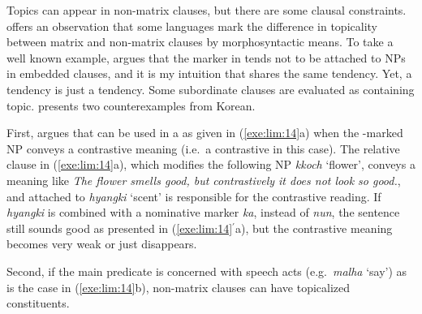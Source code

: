 Topics can appear in non-matrix clauses, but there are some clausal
constraints.  \citet[126]{lambrecht:96} offers an observation that
some languages mark the difference in topicality between matrix and
non-matrix clauses by morphosyntactic means.  To take a well known
example, \citet{kuno:73} argues that the  marker \wa in
 tends not to be attached to NPs in embedded clauses,
and it is my intuition that  shares the same tendency.
Yet, a tendency is just a tendency.  Some subordinate clauses are
evaluated as containing topic.   presents two
counterexamples from Korean.





\noindent First, \citeauthor{lim:12} argues that \nun can be used in a
 as given in (\ref{exe:lim:14}a) when the
\onun-marked NP conveys a contrastive meaning (i.e.\ a contrastive
 in this case).  The relative clause in (\ref{exe:lim:14}a),
which modifies the following NP \textit{kkoch} `flower', conveys a
meaning like \textit{The flower smells good, but contrastively it does
  not look so good.}, and \nun attached to \textit{hyangki} `scent' is
responsible for the contrastive reading. If \textit{hyangki} is
combined with a nominative marker \textit{ka}, instead of
\textit{nun}, the sentence still sounds good as presented in
(\ref{exe:lim:14}$^\ensuremath{\prime}$a), but the contrastive meaning
becomes very weak or just disappears.




\noindent Second, if the main predicate is concerned with speech acts
(e.g.\ \textit{malha} `say') as is the case in (\ref{exe:lim:14}b),
non-matrix clauses can have topicalized constituents.



